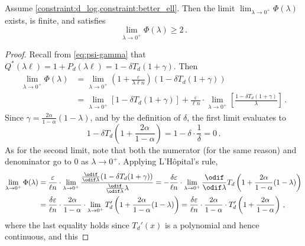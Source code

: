 \documentclass{theoretics}
\renewcommand{\epsilon}{\varepsilon}
\begin{document}
\begin{proposition}
    \label{res:phi-limit-0}
    Assume \cref{constraint:d_log,constraint:better_ell}. Then the limit $\lim_{\lambda \to 0^+}
    \Phi(\lambda)$ exists, is finite, and satisfies
    \begin{equation}
        \label{eq:phi-lb}
        \lim_{\lambda \to 0^+} \Phi(\lambda) \ge 2 \,.
    \end{equation}
\end{proposition}
\begin{proof}
    Recall from \cref{eq:psi-gamma} that $Q^*(\lambda \ell) = 1 + P_d(\lambda \ell) = 1 -
    \delta T_d(1 + \gamma)$. Then 
    \begin{align*}
        \lim_{\lambda \to 0^+} \Phi(\lambda)
        &= \lim_{\lambda \to 0^+}
            \left(1 + \frac{\epsilon}{\lambda \ell n}\right)
            \left(1 - \delta T_d(1 + \gamma)\right) \\
        &= \lim_{\lambda \to 0^+} \left[ 1 - \delta T_d(1 + \gamma) \right]
            + \frac{\epsilon}{\ell n} \cdot \lim_{\lambda \to 0^+} \left[
                \frac{1 - \delta T_d(1 + \gamma)}{\lambda} \right] \,.
    \end{align*}
    Since $\gamma = \frac{2\alpha}{1-\alpha}(1-\lambda)$, and by the definition of $\delta$, the
    first limit evaluates to
    \[
        1 - \delta T_d\left(1 + \frac{2\alpha}{1-\alpha}\right) = 1 - \delta \cdot \frac{1}{\delta}
        = 0 \,.
    \]
    As for the second limit, note that both the numerator (for the same reason) and denominator go
    to $0$ as $\lambda \to 0^+$. Applying L'Hôpital's rule,
    \begin{align*}
        \lim_{\lambda \to 0^+} \Phi(\lambda)
        &= \frac{\epsilon}{\ell n} \cdot \lim_{\lambda \to 0^+}
        \frac{\frac{\odif}{\odif \lambda} (1 - \delta T_d(1 + \gamma))}
             {\frac{\odif}{\odif \lambda} \lambda}
        = -\frac{\delta \epsilon}{\ell n} \cdot \lim_{\lambda \to 0^+}
            \frac{\odif}{\odif \lambda} T_d\left(1 + \frac{2\alpha}{1-\alpha}(1-\lambda)\right) \\
        &= \frac{\delta \epsilon}{\ell n} \cdot \frac{2\alpha}{1-\alpha} \cdot
            \lim_{\lambda \to 0^+} T_d'\left(1 + \frac{2\alpha}{1-\alpha}(1-\lambda)\right)
        = \frac{\delta \epsilon}{\ell n} \cdot \frac{2\alpha}{1-\alpha} \cdot
            T_d'\left(1 + \frac{2\alpha}{1-\alpha}\right) \,,
    \end{align*}
    where the last equality holds since $T_d'(x)$ is a polynomial and hence continuous, and this

\end{proof}
\end{document}

